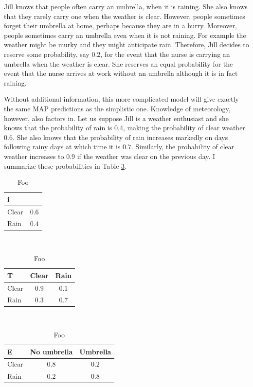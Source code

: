 Jill knows that people often carry an umbrella, when it is
raining. She also knows that they rarely carry one when the weather is
clear. However, people sometimes forget their umbrella at home,
perhaps because they are in a hurry. Moreover, people sometimes carry
an umbrella even when it is not raining. For example the weather might
be murky and they might anticipate rain. Therefore, Jill decides to
reserve some probability, say $0.2$, for the event that the nurse is
carrying an umbrella when the weather is clear. She reserves an equal
probability for the event that the nurse arrives at work without an
umbrella although it is in fact raining.
 
Without additional information, this more complicated model will give
exactly the same MAP predictions as the simplistic one. Knowledge of
meteorology, however, also factors in. Let us suppose Jill is a
weather enthusiast and she knows that the probability of rain is
$0.4$, making the probability of clear weather $0.6$. She also knows
that the probability of rain increases markedly on days following
rainy days at which time it is $0.7$.  Similarly, the probability of
clear weather increases to $0.9$ if the weather was clear on the
previous day. I summarize these probabilities in Table \ref{hmm-ex-1}.

\begin{table}[!htb]
\begin{center}
\begin{tabular}{|l|c|}
\hline
   i   &       \\
\hline
Clear  & $0.6$ \\
Rain   & $0.4$ \\
\hline
\end{tabular}~~~
\begin{tabular}{|l|cc|}
\hline
   T   & Clear & Rain  \\
\hline
Clear  & $0.9$ & $0.1$ \\
Rain   & $0.3$ & $0.7$ \\
\hline
\end{tabular}~~~
\begin{tabular}{|l|cc|}
\hline
   E    & No umbrella & Umbrella \\
\hline
Clear   & $0.8$ &  $0.2$         \\
Rain    & $0.2$ &  $0.8$         \\
\hline
\end{tabular}
\end{center}
\caption{Foo}\label{hmm-ex-1}
\end{table}

